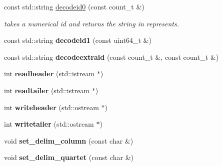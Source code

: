 \begin{DoxyCompactItemize}
\item 
\hypertarget{classprofile__header_a09b249547f4b94702d67f4a7a02a2a20}{const std\-::string \hyperlink{classprofile__header_a09b249547f4b94702d67f4a7a02a2a20}{decodeid0} (const count\-\_\-t \&)}\label{classprofile__header_a09b249547f4b94702d67f4a7a02a2a20}

\begin{DoxyCompactList}\small\item\em takes a numerical id and returns the string in represents. \end{DoxyCompactList}\item 
\hypertarget{classprofile__header_af017239b7a58cba90efa1d2196210f7e}{const std\-::string {\bfseries decodeid1} (const uint64\-\_\-t \&)}\label{classprofile__header_af017239b7a58cba90efa1d2196210f7e}

\item 
\hypertarget{classprofile__header_a12fb61349299851354da9c9d53cffbc6}{const std\-::string {\bfseries decodeextraid} (const count\-\_\-t \&, const count\-\_\-t \&)}\label{classprofile__header_a12fb61349299851354da9c9d53cffbc6}

\item 
\hypertarget{classprofile__header_ad9bd955be08aba0c07bad05c03a9fe7b}{int {\bfseries readheader} (std\-::istream $\ast$)}\label{classprofile__header_ad9bd955be08aba0c07bad05c03a9fe7b}

\item 
\hypertarget{classprofile__header_af1e7906989052ab477b0cc6819109ce1}{int {\bfseries readtailer} (std\-::istream $\ast$)}\label{classprofile__header_af1e7906989052ab477b0cc6819109ce1}

\item 
\hypertarget{classprofile__header_aa3cf9f42826a02edaec056d98a12bf55}{int {\bfseries writeheader} (std\-::ostream $\ast$)}\label{classprofile__header_aa3cf9f42826a02edaec056d98a12bf55}

\item 
\hypertarget{classprofile__header_aa723135e0c39d89a5110a099dbf988f3}{int {\bfseries writetailer} (std\-::ostream $\ast$)}\label{classprofile__header_aa723135e0c39d89a5110a099dbf988f3}

\item 
\hypertarget{classprofile__header_a7ab9dc4f50b3633869e666fc19e6a75e}{void {\bfseries set\-\_\-delim\-\_\-column} (const char \&)}\label{classprofile__header_a7ab9dc4f50b3633869e666fc19e6a75e}

\item 
\hypertarget{classprofile__header_ae394520b6c5dee31982ce0930673e34e}{void {\bfseries set\-\_\-delim\-\_\-quartet} (const char \&)}\label{classprofile__header_ae394520b6c5dee31982ce0930673e34e}


\end{DoxyCompactItemize}
